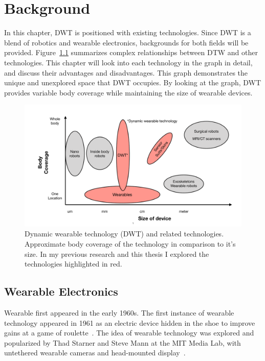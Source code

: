
\chapter{Background}
In this chapter, DWT is positioned with existing technologies. Since DWT is a blend of robotics and wearable electronics, backgrounds for both fields will be provided. Figure~\ref{fig:technologies_size_coverage} summarizes complex relationships between DTW and other technologies. This chapter will look into each technology in the graph in detail, and discuss their advantages and disadvantages. This graph demonstrates the unique and unexplored space that DWT occupies. By looking at the graph, DWT provides variable body coverage while maintaining the size of wearable devices. 


\begin{figure}[!ht]
\centering
\includegraphics[width=\textwidth]{pictures/chapter2/graph_background.pdf}
\caption{Dynamic wearable technology (DWT) and related technologies. Approximate body coverage of the technology in comparison to it's size. In my previous research and this thesis I explored the technologies highlighted in red.  }
\label{fig:technologies_size_coverage}
\end{figure}

\section{Wearable Electronics}
Wearable first appeared in the early 1960s. The first instance of wearable technology appeared in 1961 as an electric device hidden in the shoe to improve gains at a game of  roulette~\cite{thorp1998invention}. The idea of wearable technology was explored and popularized by Thad Starner and Steve Mann at the MIT Media Lab, with untethered wearable cameras and head-mounted display~\cite{mann1997wearable}. 

